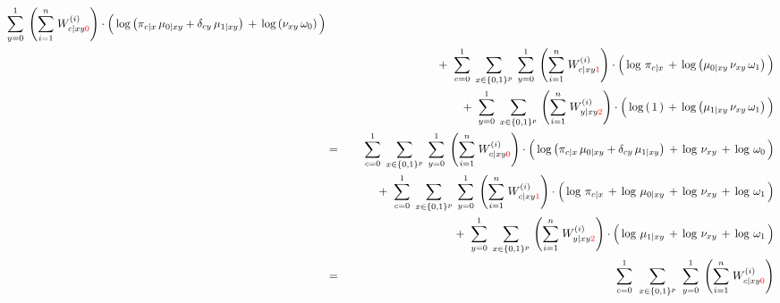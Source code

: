 \begin{enumerate}
\begin{eqnarray*}
	\overset{1}{\underset{y=0}{\sum}}\;
	\left(\overset{n}{\underset{i=1}{\sum}}\;W^{(i)}_{c \vert xy{\color{red}0}}\right)
	\cdot
	\left(\,
		\log\left(\pi_{c \vert x}\,\mu_{0 \vert xy} + \delta_{cy}\,\mu_{1\vert xy}\right)
		\,\overset{{\color{white}.}}{+}\,
		\log\left(\nu_{xy}\,\omega_{0}\right)
	\,\right)
\\
&&
	+ \;\;
	\overset{1}{\underset{c=0}{\sum}}
	\;\,\underset{x\in\{0,1\}^{p}}{\sum}\;\,
	\overset{1}{\underset{y=0}{\sum}}\;
	\left(\overset{n}{\underset{i=1}{\sum}}\;W^{(i)}_{c \vert xy{\color{red}1}}\right)
	\cdot
	\left(\,
		\log\,\pi_{c \vert x}
		\,\overset{{\color{white}.}}{+}\,
		\log\left(\mu_{0\vert xy}\,\nu_{xy}\,\omega_{1}\right)
	\,\right)
\\
&&
	+ \;\;
	\overset{1}{\underset{y=0}{\sum}}
	\;\,\underset{x\in\{0,1\}^{p}}{\sum}\,
	\left(\overset{n}{\underset{i=1}{\sum}}\;W^{(i)}_{y \vert xy{\color{red}2}}\right)
	\cdot
	\left(\,
		\log\left(\,1\,\right)
		\,\overset{{\color{white}.}}{+}\,
		\log\left(\mu_{1 \vert xy}\,\nu_{xy}\,\omega_{1}\right)
	\,\right)
\\
&=&
	{\color{white}+} \;\;
	\overset{1}{\underset{c=0}{\sum}}
	\;\,\underset{x\in\{0,1\}^{p}}{\sum}\;\,
	\overset{1}{\underset{y=0}{\sum}}\;
	\left(\overset{n}{\underset{i=1}{\sum}}\;W^{(i)}_{c \vert xy{\color{red}0}}\right)
	\cdot
	\left(\,
		\log\left(\pi_{c \vert x}\,\mu_{0 \vert xy} + \delta_{cy}\,\mu_{1\vert xy}\right)
		\,\overset{{\color{white}.}}{+}\,
		\log\,\nu_{xy}
		\,\overset{{\color{white}.}}{+}\,
		\log\,\omega_{0}
	\,\right)
\\
&&
	+ \;\;
	\overset{1}{\underset{c=0}{\sum}}
	\;\,\underset{x\in\{0,1\}^{p}}{\sum}\;\,
	\overset{1}{\underset{y=0}{\sum}}\;
	\left(\overset{n}{\underset{i=1}{\sum}}\;W^{(i)}_{c \vert xy{\color{red}1}}\right)
	\cdot
	\left(\,
		\log\,\pi_{c \vert x}
		\,\overset{{\color{white}.}}{+}\,
		\log\,\mu_{0\vert xy}
		\,\overset{{\color{white}.}}{+}\,
		\log\,\nu_{xy}
		\,\overset{{\color{white}.}}{+}\,
		\log\,\omega_{1}
	\,\right)
\\
&&
	+ \;\;
	\overset{1}{\underset{y=0}{\sum}}
	\;\,\underset{x\in\{0,1\}^{p}}{\sum}\,
	\left(\overset{n}{\underset{i=1}{\sum}}\;W^{(i)}_{y \vert xy{\color{red}2}}\right)
	\cdot
	\left(\,
		\log\,\mu_{1 \vert xy}
		\,\overset{{\color{white}.}}{+}\,
		\log\,\nu_{xy}
		\,\overset{{\color{white}.}}{+}\,
		\log\,\omega_{1}
	\,\right)
\\
&=&
	{\color{white}+} \;\;
	\overset{1}{\underset{c=0}{\sum}}\;\;
	\underset{x\in\{0,1\}^{p}}{\sum}\;\;
	\overset{1}{\underset{y=0}{\sum}}\;
	\left(\overset{n}{\underset{i=1}{\sum}}\;W^{(i)}_{c \vert xy{\color{red}0}}\right)

\end{eqnarray*}
\end{enumerate}
